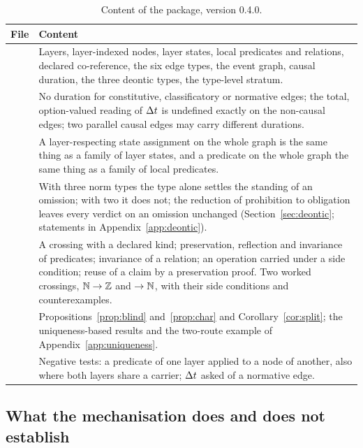 \begin{table}[t]
\centering\small
\begin{tabularx}{\textwidth}{@{}P{3.1cm}L@{}}
\toprule
File & Content \\
\midrule
{} &
  Layers, layer-indexed nodes, layer states, local predicates and relations, declared
  co-reference, the six edge types, the event graph, causal duration, the three deontic
  types, the type-level stratum. \\
 &
  No duration for constitutive, classificatory or normative edges; the total,
  option-valued reading of $\Delta t$ is undefined exactly on the non-causal edges; two
  parallel causal edges may carry different durations. \\
 &
  A layer-respecting state assignment on the whole graph is the same thing as a family
  of layer states, and a predicate on the whole graph the same thing as a family of
  local predicates. \\
 &
  With three norm types the type alone settles the standing of an omission; with two it
  does not; the reduction of prohibition to obligation leaves every verdict on an
  omission unchanged (Section~\ref{sec:deontic}; statements in
  Appendix~\ref{app:deontic}). \\
 &
  A crossing with a declared kind; preservation, reflection and invariance of
  predicates; invariance of a relation; an operation carried under a side condition;
  reuse of a claim by a preservation proof. Two worked crossings, $\mathbb{N} \to \mathbb{Z}$ and
   $\to \mathbb{N}$, with their side conditions and counterexamples. \\
 &
  Propositions~\ref{prop:blind} and~\ref{prop:char} and Corollary~\ref{cor:split}; the
  uniqueness-based results and the two-route example of
  Appendix~\ref{app:uniqueness}. \\
 &
  Negative tests: a predicate of one layer applied to a node of another, also where
  both layers share a carrier; $\Delta t$ asked of a normative edge. \\
\bottomrule
\end{tabularx}
\caption{Content of the  package, version 0.4.0.}
\label{tab:mech}
\end{table}

\subsection{What the mechanisation does and does not establish}
\label{sec:mech-limits}

